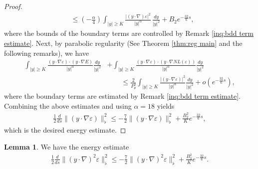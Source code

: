 \documentclass[11pt,reqno]{amsart}
\theoremstyle{definition}
\theoremstyle{bfremark}
\newtheorem{lemma}{Lemma}[section]
\numberwithin{equation}{section}
\begin{document}
\begin{proof}
\begin{align*}
    &\leq \left( -\frac{\alpha}{4} \right) \int_{|y| \geq K}\frac{|(y \cdot \nabla)\varepsilon|^2}{|y|^{\alpha}}\,\frac{dy}{|y|^2}+B_2e^{-\frac{32}{6}s},
\end{align*}
where the bounds of the boundary terms are controlled by Remark \ref{inq:bdd term estimate}. Next, by parabolic regularity (See Theorem \ref{thm:reg main} and the following remarks), we have 
\begin{align*}
     \int_{|y| \geq K} \frac{(y \cdot \nabla \varepsilon) \cdot (y \cdot \nabla E)}{|y|^{\alpha}}\frac{dy}{|y|^2}&+\int_{|y| \geq K} \frac{(y \cdot \nabla \varepsilon) \cdot (y \cdot \nabla NL(\varepsilon))}{|y|^{\alpha}}\frac{dy}{|y|^2} \\
     & \qquad \leq \frac{2}{P_{\theta}^3} \int_{|y|\geq K}\frac{|(y \cdot \nabla \varepsilon)|^2}{|y|^{\alpha}}\frac{dy}{|y|^2}+o(e^{-\frac{32}{6}s}),
\end{align*}
where the boundary terms are estimated by Remark \ref{inq:bdd term estimate}. Combining the above estimates and using \(\alpha=18\) yields
\begin{align}
        \frac{1}{2}\frac{d}{ds}\|(y \cdot \nabla \varepsilon)\|_{\flat}^2 \leq-\frac{7}{2}\|(y \cdot \nabla \varepsilon)\|^2_{\flat}+\frac{B_2^2}{K} e^{-\frac{32}{6}s},
\end{align}
which is the desired energy estimate.
\end{proof}

\begin{lemma}
\label{Lemma5.7}
We have the energy estimate
\begin{align}
    \frac{1}{2} \frac{d}{ds} \|(y \cdot \nabla)^2 \varepsilon\|_{\flat}^2 
    \leq -\frac{7}{2} \|(y \cdot \nabla)^2 \varepsilon\|_{\flat}^2 + \frac{B_3^2}{K}e^{-\frac{32}{6}s}.
    \label{en5} 
\end{align}
\end{lemma}
\end{document}
